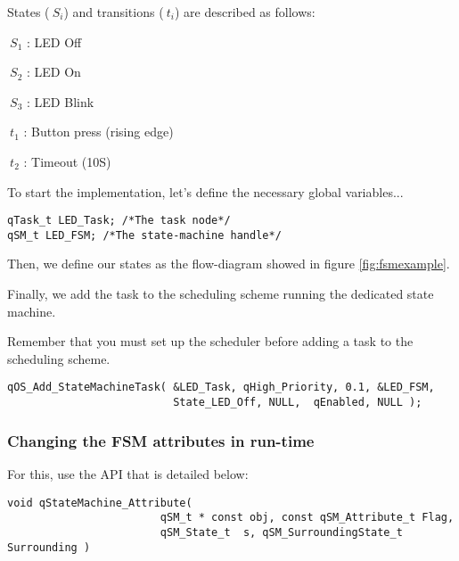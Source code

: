 States ($\ S_i$) and transitions ($\ t_i$) are described as follows: 
\medskip
\begin{itemize}
\begin{minipage}{0.4\linewidth}
    \item $\ S_1$ : LED Off
    \item $\ S_2$ : LED On
    \item $\ S_3$ : LED Blink
\end{minipage}
\begin{minipage}{0.4\linewidth}
    \item $\ t_1$ : Button press (rising edge)
    \item $\ t_2$ : Timeout (10S)
\end{minipage}
\end{itemize}



To start the implementation, let's define the necessary global variables...

\begin{lstlisting}[style=CStyle]
qTask_t LED_Task; /*The task node*/
qSM_t LED_FSM; /*The state-machine handle*/
\end{lstlisting}

Then, we define our states as the flow-diagram showed in figure \ref{fig:fsmexample}.



Finally, we add the task to the scheduling scheme running the dedicated state machine.

Remember that you must set up the scheduler before adding a task to the scheduling scheme.
\medskip

\begin{lstlisting}[style=CStyle]
qOS_Add_StateMachineTask( &LED_Task, qHigh_Priority, 0.1, &LED_FSM,
                          State_LED_Off, NULL,  qEnabled, NULL );
\end{lstlisting}

\subsubsection{Changing the FSM attributes in run-time}
For this, use the API  that is detailed below:
\medskip

\begin{lstlisting}[style=CStyle]
void qStateMachine_Attribute( 
                        qSM_t * const obj, const qSM_Attribute_t Flag, 
                        qSM_State_t  s, qSM_SurroundingState_t Surrounding )
\end{lstlisting}

